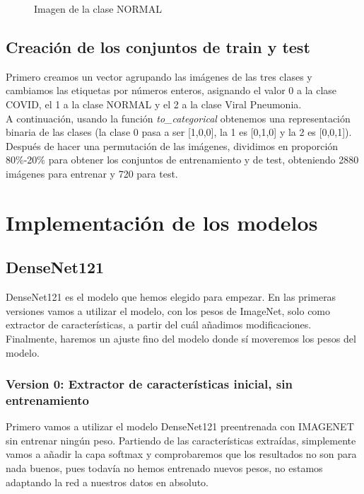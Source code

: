 \documentclass[11pt,a4paper]{article}
\theoremstyle{definition}
\begin{document}
\begin{figure}[h]
\begin{minipage}[b]{0.25\textwidth}
	\caption{Imagen de la clase NORMAL}
  \end{minipage}
\end{figure}


\subsection{Creación de los conjuntos de train y test}

Primero creamos un vector agrupando las imágenes de las tres clases y cambiamos las etiquetas por números enteros, asignando el valor 0 a la clase COVID, el 1 a la clase NORMAL y el 2 a la clase Viral Pneumonia.\\

A continuación, usando la función \textit{to\_categorical} obtenemos una representación binaria de las clases (la clase 0 pasa a ser [1,0,0], la 1 es [0,1,0] y la 2 es [0,0,1]).\\

Después de hacer una permutación de las imágenes, dividimos en proporción 80\%-20\% para obtener los conjuntos de entrenamiento y de test, obteniendo 2880 imágenes para entrenar y 720 para test.



\section{Implementación de los modelos}

\subsection{DenseNet121}

DenseNet121 es el modelo que hemos elegido para empezar. En las primeras versiones vamos a utilizar el modelo, con los pesos de ImageNet, solo como extractor de características, a partir del cuál añadimos modificaciones. Finalmente, haremos un ajuste fino del modelo donde sí moveremos los pesos del modelo.

\subsubsection{Version 0: Extractor de características inicial, sin entrenamiento}

Primero vamos a utilizar el modelo DenseNet121 preentrenada con IMAGENET sin entrenar ningún peso. Partiendo de las características extraídas, simplemente vamos a añadir la capa softmax y comprobaremos que los resultados no son para nada buenos, pues todavía no hemos entrenado nuevos pesos, no estamos adaptando la red a nuestros datos en absoluto.
\end{document}
